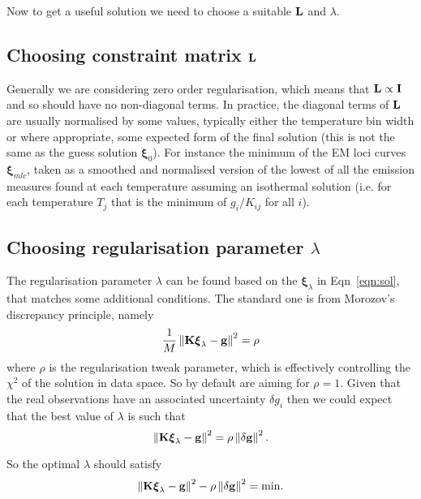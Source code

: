 \documentclass[12pt,a4paper]{article}
\begin{document}
Now to get a useful solution we need to choose a suitable ${\bf L}$ and $\lambda$.

\newpage
\vspace{-10pt}
\subsection*{Choosing constraint matrix ${\bf L}$}

Generally we are considering zero order regularisation, which means that ${\bf L} \propto {\bf I}$ and so should have no non-diagonal terms. In practice, the diagonal terms of ${\bf L}$ are usually normalised by some values, typically either the temperature bin width or where appropriate, some expected form of the final solution (this is not the same as the guess solution $\boldsymbol{\xi}_0$). For instance the minimum of the EM loci curves $\boldsymbol{\xi}_{mlc}$, taken as a smoothed and normalised version of the lowest of all the emission measures found at each temperature assuming an isothermal solution (i.e. for each temperature $T_j$ that is the minimum of $g_i/K_{ij}$ for all $i$).


\vspace{-10pt}
\subsection*{Choosing regularisation parameter $\lambda$}

The regularisation parameter $\lambda$ can be found based on the $\boldsymbol{\xi}_\lambda$ in Eqn~\ref{eqn:sol}, that matches some additional conditions. The standard one is from Morozov's discrepancy principle, namely
\begin{equation}
    \frac{1}{M}\left\|\bf{K\boldsymbol{\xi}_\lambda-g}\right\|^2  =  \rho
\end{equation}
where $\rho$ is the regularisation tweak parameter, which is effectively controlling the $\chi^2$ of the solution in data space. So by default are aiming for $\rho=1$. Given that the real observations have an associated uncertainty $\delta g_i$ then we could expect that the best value of $\lambda$ is such that 
\begin{equation}
    \left\|\bf{K\boldsymbol{\xi}_\lambda-g}\right\|^2  =  \rho \left\| {\bf \delta g}\right\|^2 .
\end{equation}

So the optimal $\lambda$ should satisfy 
\begin{equation}\label{eqn:desc}
    \left\|\bf{K\boldsymbol{\xi}_\lambda-g}\right\|^2  -  \rho \left\| {\bf \delta g}\right\|^2 = \mathrm{min}.
\end{equation}
\end{document}
